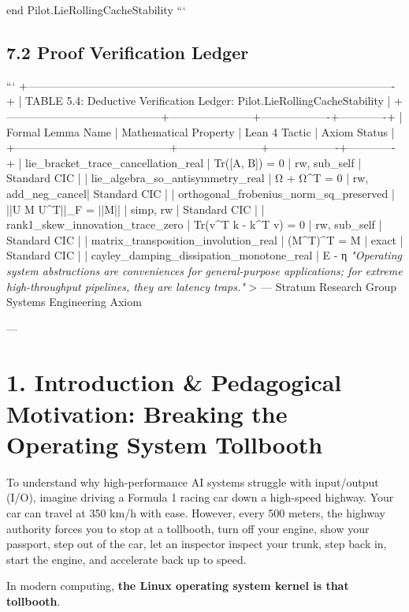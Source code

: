 \documentclass[11pt,twoside,openright]{amsbook}
\begin{document}
{{{{{{{end Pilot.LieRollingCacheStability
```

\subsection{7.2 Proof Verification Ledger}

```
+----------------------------------------------------------------------------------------------------+
| TABLE 5.4: Deductive Verification Ledger: Pilot.LieRollingCacheStability                           |
+------------------------------------------+-----------------------+-------------------+-------------+
| Formal Lemma Name                        | Mathematical Property | Lean 4 Tactic     | Axiom Status |
+------------------------------------------+-----------------------+-------------------+-------------+
| lie_bracket_trace_cancellation_real      | Tr([A, B]) = 0        | rw, sub_self      | Standard CIC |
| lie_algebra_so_antisymmetry_real         | Ω + Ω^T = 0           | rw, add_neg_cancel| Standard CIC |
| orthogonal_frobenius_norm_sq_preserved   | ||U M U^T||_F = ||M|| | simp, rw          | Standard CIC |
| rank1_skew_innovation_trace_zero         | Tr(v^T k - k^T v) = 0 | rw, sub_self      | Standard CIC |
| matrix_transposition_involution_real     | (M^T)^T = M           | exact             | Standard CIC |
| cayley_damping_dissipation_monotone_real | E - η  \textit{"Operating system abstractions are conveniences for general-purpose applications; for extreme high-throughput pipelines, they are latency traps."}  
> — Stratum Research Group Systems Engineering Axiom

---

\section{1. Introduction & Pedagogical Motivation: Breaking the Operating System Tollbooth}

To understand why high-performance AI systems struggle with input/output (I/O), imagine driving a Formula 1 racing car down a high-speed highway. Your car can travel at 350 km/h with ease.
However, every 500 meters, the highway authority forces you to stop at a tollbooth, turn off your engine, show your passport, step out of the car, let an inspector inspect your trunk, step back in, start the engine, and accelerate back up to speed.

In modern computing, \textbf{the Linux operating system kernel is that tollbooth}.

}}}}}}}
\end{document}
